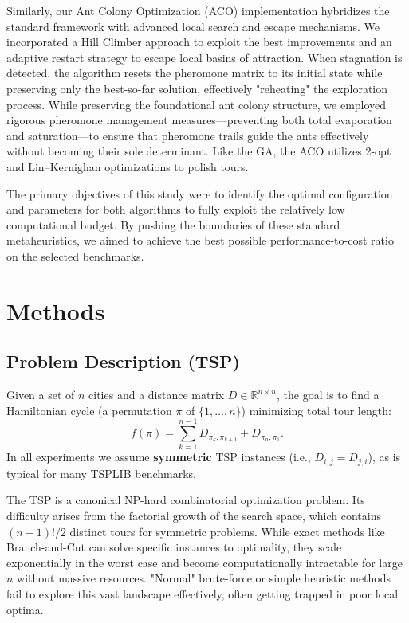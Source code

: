 \documentclass[11pt,a4paper]{article}
\begin{document}
Similarly, our Ant Colony Optimization (ACO) implementation hybridizes the standard framework with advanced local search and escape mechanisms. We incorporated a Hill Climber approach to exploit the best improvements and an adaptive restart strategy to escape local basins of attraction. When stagnation is detected, the algorithm resets the pheromone matrix to its initial state while preserving only the best-so-far solution, effectively "reheating" the exploration process. While preserving the foundational ant colony structure, we employed rigorous pheromone management measures---preventing both total evaporation and saturation---to ensure that pheromone trails guide the ants effectively without becoming their sole determinant. Like the GA, the ACO utilizes 2-opt and Lin--Kernighan optimizations to polish tours.

The primary objectives of this study were to identify the optimal configuration and parameters for both algorithms to fully exploit the relatively low computational budget. By pushing the boundaries of these standard metaheuristics, we aimed to achieve the best possible performance-to-cost ratio on the selected benchmarks.

\section{Methods}
\subsection{Problem Description (TSP)}
Given a set of $n$ cities and a distance matrix $D\in\mathbb{R}^{n\times n}$, the goal is to find a Hamiltonian cycle (a permutation $\pi$ of $\{1,\dots,n\}$) minimizing total tour length:
\[
  f(\pi) = \sum_{k=1}^{n-1} D_{\pi_k,\pi_{k+1}} + D_{\pi_n,\pi_1}.
\]
In all experiments we assume \textbf{symmetric} TSP instances (i.e., $D_{i,j}=D_{j,i}$), as is typical for many TSPLIB benchmarks.

The TSP is a canonical NP-hard combinatorial optimization problem. Its difficulty arises from the factorial growth of the search space, which contains $(n-1)!/2$ distinct tours for symmetric problems. While exact methods like Branch-and-Cut can solve specific instances to optimality, they scale exponentially in the worst case and become computationally intractable for large $n$ without massive resources. "Normal" brute-force or simple heuristic methods fail to explore this vast landscape effectively, often getting trapped in poor local optima.
\end{document}
